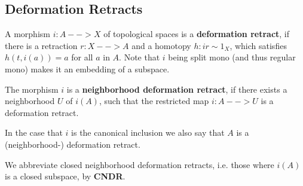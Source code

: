 	\newpage
	\subsection{Deformation Retracts}

	\begin{definition}
		A morphism $i:A --> X$ of topological spaces is a \textbf{deformation retract}, if there is a retraction $r:X --> A$ and a homotopy $h:ir \sim 1_X$, which satisfies $h(t,i(a)) = a$ for all $a$ in $A$. Note that $i$ being split mono (and thus regular mono) makes it an embedding of a subspace.

		The morphism $i$ is a \textbf{neighborhood deformation retract}, if there exists a neighborhood $U$ of $i(A)$, such that the restricted map $i:A-->U$ is a deformation retract.

		In the case that $i$ is the canonical inclusion we also say that $A$ is a (neighborhood-) deformation retract.

		We abbreviate closed neighborhood deformation retracts, i.e. those where $i(A)$ is a closed subspace, by \textbf{CNDR}.
	\end{definition}

